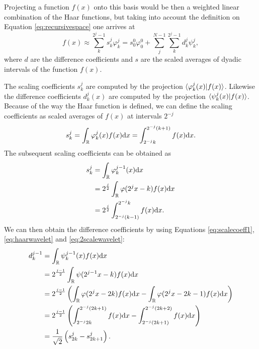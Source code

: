 \documentclass[../master_thesis.tex]{subfiles}
\begin{document}
Projecting a function $f(x)$ onto this basis would be then a weighted linear combination
of the Haar functions, but taking into account the definition on Equation \ref{eq:recursivespace} one arrives
at \cite{Sorland}
\begin{equation}\label{eq:projectftohaar}
  f(x)\approx \sum^{2^j -1}_k s^j_k\varphi^j_k = s^0_0\varphi^0_0 + \sum^{N - 1}_j\sum^{2^j -1}_k d^j_k\psi^j_k,
\end{equation}
where $d$ are the difference coefficients and $s$ are the scaled averages of dyadic intervals of the function $f(x)$.

The scaling coefficients $s^j_k$ are computed by the projection $\braket{\varphi^j_k(x)|f(x)}$.
Likewise the difference coefficients $d^j_k(x)$ are computed by the projection \newline$\braket{\psi^j_k(x)|f(x)}$.
Because of the way the Haar function is defined, we can define  the scaling coefficients as
scaled averages of $f(x)$ at intervals $2^{-j}$ \cite{Sorland, Beylkin:MRA}
\begin{equation}
  s^j_k = \int_{\mathbb{R}}\varphi^j_k(x)f(x)\text{d}x = \int^{2^{-j}(k + 1)}_{2^{-j}k} f(x) \text{d}x\label{eq:scalecoeff1}.
\end{equation}
The subsequent scaling coefficients can be obtained as
\begin{align}
  \begin{split}\label{eq:scalecoeffint}
    s^{j}_k &= \int_{\mathbb{R}}\varphi^{j-1}_k(x)\text{d}x\\
            &= 2^{\frac{j}{2}}\int_{\mathbb{R}}\varphi(2^{j}x - k)f(x)\text{d}x\\
            &= 2^{\frac{j}{2}}\int_{2^{-j}(k-1)}^{2^{-j}k}f(x)\text{d}x.\\
  \end{split}
\end{align}
We can then obtain the difference coefficients by using Equations \ref{eq:scalecoeff1}, \ref{eq:haarwavelet} and \ref{eq:2scalewavelet}:
\begin{align}
  \begin{split}\label{eq:diffcoeffint}
    d^{j - 1}_k &= \int_{\mathbb{R}}\psi^{j-1}_k(x)f(x)\text{d}x\\
                &= 2^{\frac{j - 1}{2}}\int_{\mathbb{R}}\psi(2^{j-1}x - k)f(x)\text{d}x\\
                &= 2^{\frac{j - 1}{2}}\left(\int_{\mathbb{R}}\varphi(2^jx - 2k)f(x)\text{d}x  - \int_{\mathbb{R}}\varphi(2^jx - 2k - 1)f(x)\text{d}x\right)\\
                &= 2^{\frac{j - 1}{2}}\left( \int^{2^{-j}(2k+1)}_{2^{-j}2k}f(x)\text{d}x - \int^{2^{-j}(2k+2)}_{2^{-j}(2k + 1)}f(x)\text{d}x \right)\\
                &= \frac{1}{\sqrt{2}}\left(s^{j}_{2k} - s^{j}_{2k+1} \right).
  \end{split}
\end{align}
\end{document}
